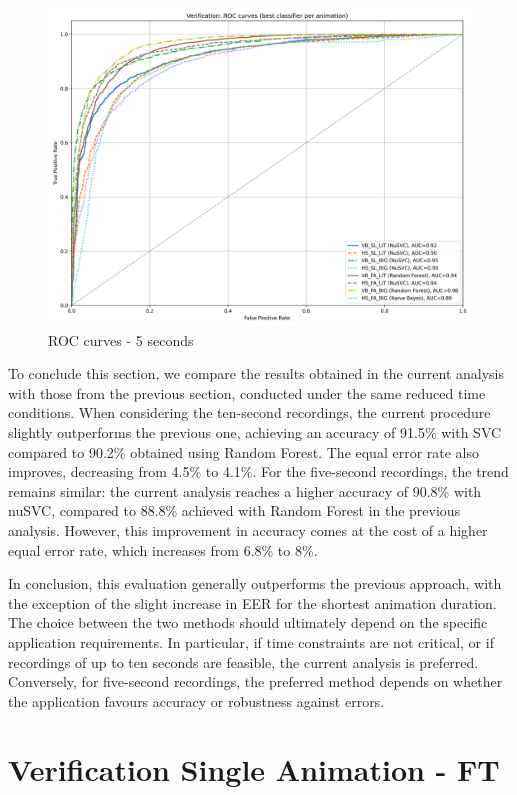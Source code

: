\documentclass[12pt]{report}
\begin{document}
\begin{figure}[ht]
    \centering
    \includegraphics[width = 0.6
    \textwidth]{Images/Results/Classic_procedure/five_ten/st/five/Verification_single_roc_classic_five_st.png}
    \caption{ROC curves - 5 seconds}
    \label{fig:roc_cst_5}
\end{figure}

To conclude this section, we compare the results obtained in the current analysis with those from the previous section, conducted under the same reduced time conditions.
When considering the ten-second recordings, the current procedure slightly outperforms the previous one, achieving an accuracy of 91.5\% with SVC compared to 90.2\% obtained using Random Forest. 
The equal error rate also improves, decreasing from 4.5\% to 4.1\%.
For the five-second recordings, the trend remains similar: the current analysis reaches a higher accuracy of 90.8\% with nuSVC, compared to 88.8\% achieved with Random Forest in the previous analysis. 
However, this improvement in accuracy comes at the cost of a higher equal error rate, which increases from 6.8\% to 8\%.

In conclusion, this evaluation generally outperforms the previous approach, with the exception of the slight increase in EER for the shortest animation duration.
The choice between the two methods should ultimately depend on the specific application requirements. 
In particular, if time constraints are not critical, or if recordings of up to ten seconds are feasible, the current analysis is preferred. 
Conversely, for five-second recordings, the preferred method depends on whether the application favours accuracy or robustness against errors.
\FloatBarrier

\section{Verification Single Animation - FT}
\label{subsec:terza_ver}
\end{document}
